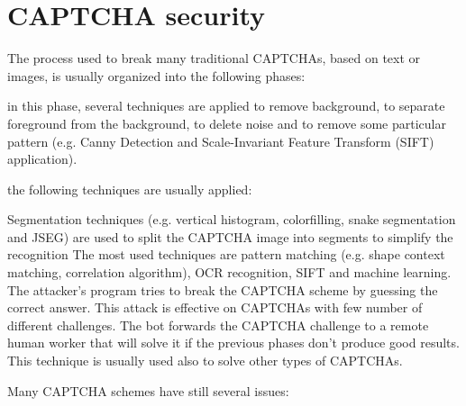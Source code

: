 \section{CAPTCHA security}\label{soa:security_CAPTCHAs}
The process used to break many traditional CAPTCHAs, based on text or images, is usually organized into the following phases\cite{CAPTCHA_attack_process}:
\begin{enumerate}
{in this phase, several techniques are applied to remove background, to separate foreground from the background, to delete noise and to remove some particular pattern (e.g. Canny Detection and Scale-Invariant Feature Transform (SIFT) application).
}
{the following techniques are usually applied:
\begin{itemize}
{Segmentation techniques (e.g. vertical histogram, colorfilling, snake segmentation and JSEG) are used to split the CAPTCHA image into segments to simplify the recognition}
{The most used techniques are pattern matching (e.g. shape context matching, correlation algorithm), OCR recognition, SIFT and machine learning.}
{The attacker's program tries to break the CAPTCHA scheme by guessing the correct answer. This attack is effective on CAPTCHAs with few number of different challenges.}
{The bot forwards the CAPTCHA challenge to a remote human worker that will solve it if the previous phases don't produce good results. This technique is usually used also to solve other types of CAPTCHAs.}
\end{itemize}
}
\end{enumerate}
Many CAPTCHA schemes have still several issues:
